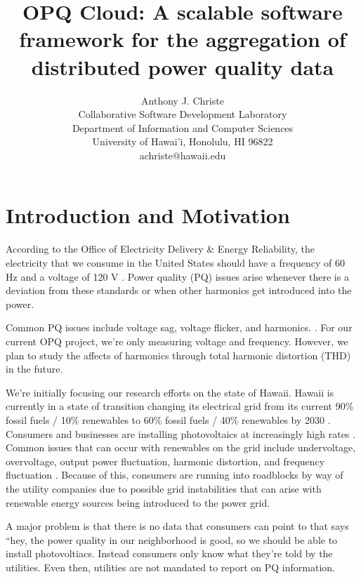 \documentclass[11pt]{article}
\begin{document}
\title{OPQ Cloud: A scalable software framework for the aggregation of distributed power quality data}
\author{Anthony J. Christe \\
      Collaborative Software Development Laboratory \\
      Department of Information and Computer Sciences \\
      University of Hawai'i,  Honolulu, HI 96822 \\
      achriste@hawaii.edu}
\maketitle

\tableofcontents
\listoftables
\listoffigures
\newpage
\section{Introduction and Motivation}
According to the Office of Electricity Delivery \& Energy Reliability, the electricity that we consume in the United States should have a frequency of 60 Hz and a voltage of 120 V \cite{OEDER}. Power quality (PQ) issues arise whenever there is a deviation from these standards or when other harmonics get introduced into the power.

Common PQ issues include voltage sag, voltage flicker, and harmonics.   \cite{atputharajah}. For our current OPQ project, we're only measuring voltage and frequency. However, we plan to study the affects of harmonics through total harmonic distortion (THD) in the future.

We're initially focusing our research efforts on the state of Hawaii. Hawaii is currently in a state of transition changing its electrical grid from its current 90\% fossil fuels / 10\% renewables to 60\% fossil fuels / 40\% renewables by 2030 \cite{hawaii-mandate}. Consumers and businesses are installing photovoltaics at increasingly high rates \cite{pv-rates}. Common issues that can occur with renewables on the grid include undervoltage, overvoltage, output power fluctuation, harmonic distortion, and frequency fluctuation \cite{Farhoodnea}. Because of this, consumers are running into roadblocks by way of the utility companies due to possible grid instabilities that can arise with renewable energy sources \cite{pv-pushback} being introduced to the power grid. 

A major problem is that there is no data that consumers can point to that says ``hey, the power quality in our neighborhood is good, so we should be able to install photovoltiacs. Instead consumers only know what they're told by the utilities. Even then, utilities are not mandated to report on PQ information.
\end{document}
